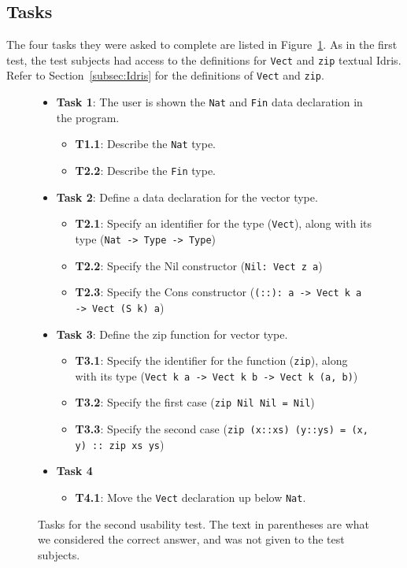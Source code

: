 \subsection{Tasks}
The four tasks they were asked to complete are listed in 
Figure~\ref{figure:second_tasks}.
As in the first test, the test subjects had access to the definitions for
\texttt{Vect} and \texttt{zip} textual Idris. Refer to Section~\ref{subsec:Idris}
for the definitions of \texttt{Vect} and \texttt{zip}.

\begin{figure}
\centering
\begin{itemize}
	\item \textbf{Task 1}: The user is shown the \texttt{Nat} and \texttt{Fin} data declaration in the program.
	\begin{itemize}
		\item \textbf{T1.1}: Describe the \texttt{Nat} type.
		\item \textbf{T2.2}: Describe the \texttt{Fin} type.
	\end{itemize}
	\item \textbf{Task 2}: Define a data declaration for the vector type.
	\begin{itemize}
		\item \textbf{T2.1}: Specify an identifier for the type (\texttt{Vect}), along with its type (\texttt{Nat -> Type -> Type})
		\item \textbf{T2.2}: Specify the Nil constructor (\texttt{Nil: Vect z a})
		\item \textbf{T2.3}: Specify the Cons constructor (\texttt{(::): a -> Vect k a -> Vect (S k) a})
	\end{itemize}
	\item \textbf{Task 3}: Define the zip function for vector type.
	\begin{itemize}
		\item \textbf{T3.1}: Specify the identifier for the function (\texttt{zip}), along with its type (\texttt{Vect k a -> Vect k b -> Vect k (a, b)})
		\item \textbf{T3.2}: Specify the first case (\texttt{zip Nil Nil = Nil})
		\item \textbf{T3.3}: Specify the second case (\texttt{zip (x::xs) (y::ys) = (x, y) :: zip xs ys})
	\end{itemize}
	\item \textbf{Task 4}
	\begin{itemize}
		\item \textbf{T4.1}: Move the \texttt{Vect} declaration up below \texttt{Nat}.
	\end{itemize}
\end{itemize}
\caption{Tasks for the second usability test. The text in parentheses are what we considered the correct answer, and was not given to the test subjects.}
\label{figure:second_tasks}
\end{figure}

